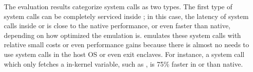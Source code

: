 The evaluation results categorize
system calls as two types.
The first type of system calls can be completely serviced inside \thelibos{};
in this case, the latency of system calls
inside \graphene{} or \graphenesgx{}
is close to the native performance,
or even faster than native,
depending on how optimized the emulation is.
\graphene{} emulates
these system calls with relative small costs or even performance gains
because there is almost no needs
to use system calls in the host OS or even exit enclaves.
For instance,
a system call which only fetches a in-kernel variable, such as ,
is 75\% faster in \graphene{} or \graphenesgx{} than native.
